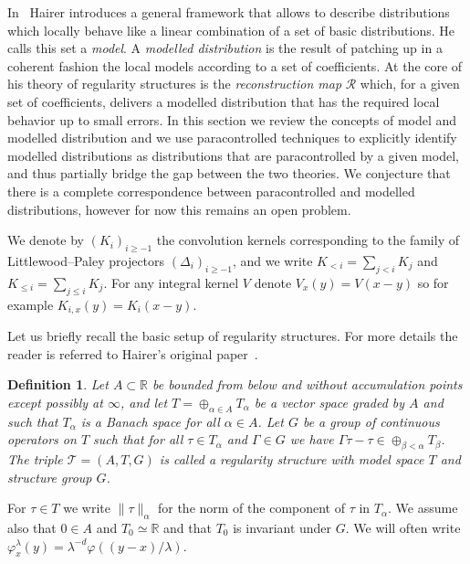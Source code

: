\documentclass[a4paper,11pt]{article}
\newtheorem{definition}[theorem]{Definition}
\theoremstyle{remark}
\newcommand{\R}{\mathbb{R}}
\begin{document}
In~{\cite{Hairer2013a}} Hairer introduces a general framework that allows to
describe distributions which locally behave like a linear combination of a set
of basic distributions. He calls this set a \emph{model}. A \emph{modelled distribution} is the result of
patching up in a coherent fashion the local models according to a set of
coefficients. At the core of his theory of
regularity structures is the \emph{reconstruction map} $\mathcal{R}$
which, for a given set of coefficients, delivers a modelled distribution that
has the required local behavior up to small errors. In this section we review
the concepts of model and modelled distribution and we use paracontrolled
techniques to explicitly identify modelled distributions as distributions that are 
paracontrolled by a given model, and thus partially bridge the gap between the two
theories. We conjecture that there is a complete correspondence between paracontrolled and modelled distributions, however for now this remains an open problem.

\medskip

We denote by $( K_{i} )_{i \geqslant -1}$ the convolution kernels corresponding to the family of Littlewood--Paley projectors $( \Delta_{i} )_{i \geqslant -1}$, and we write $K_{<i} = \sum_{j<i} K_j$ and $K_{\leqslant i} = \sum_{j \leqslant i} K_j$. For any integral kernel $V$ denote $V_{x} (
y ) =V ( x-y )$ so for example $K_{i,x} ( y ) =K_{i} ( x-y )$.

Let us briefly recall the basic setup of regularity structures. For more
details the reader is referred to Hairer's original paper~{\cite{Hairer2013a}}.

\begin{definition}
  Let $A \subset \R$ be bounded from below and without accumulation
  points except possibly at $\infty$, and let $T =  \oplus_{\alpha \in A} T_{\alpha}$ be a vector space
  graded by $A$ and such that $T_{\alpha}$ is a Banach space for all $\alpha
  \in A$. Let $G$ be a group of continuous operators on $T$ such that for all
  $\tau \in T_{\alpha}$ and $\Gamma \in G$ we have $\Gamma \tau - \tau \in
  \oplus_{\beta < \alpha} T_{\beta}$. The triple $\mathcal{T}= ( A,T,G )$ is
  called a {\emph{regularity structure}} with \emph{model space} $T$ and \emph{structure
  group} $G$.
\end{definition}

For $\tau \in T$ we write $\| \tau \|_{\alpha}$ for the norm of the component of
$\tau$ in $T_{\alpha}$. We assume also that $0 \in A$ and $T_{0} \simeq
\R$ and that $T_{0}$ is invariant under $G$. We will often write
$\varphi^{\lambda}_{x} ( y ) = \lambda^{-d} \varphi ( ( y-x ) / \lambda )$.
\end{document}
